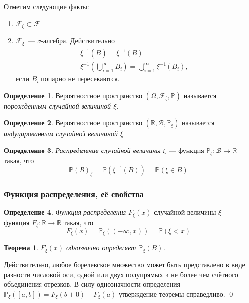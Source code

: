 \documentclass[oneside,final,14pt]{extreport}
\newcommand\myprob[1]{{\mathbb{P}(#1)}}
\renewenvironment{proof}{{\bfseries Доказательство.}}{\qed}
\newtheorem{thm}{Теорема}[section]
\theoremstyle{definition}
\newtheorem{defn}{Определение}[section]
\begin{document}
Отметим следующие факты:
\begin{enumerate}
    \item $\mathcal{F}_\xi \subset \mathcal{F}.$
    \item $\mathcal{F}_\xi$~--- $\sigma$-алгебра. Действительно
    \begin{gather*}
        \xi^{-1}(\overline{B}) = \overline{\xi^{-1}(B)} \\
        \xi^{-1}\left(\bigcup\limits_{i=1}^{\infty}B_i\right) = \bigcup\limits_{i=1}^\infty \xi^{-1}(B_i),
    \end{gather*}
   если $B_i$ попарно не пересекаются.
\end{enumerate}

\begin{defn}
    Вероятностное пространство $(\Omega,\mathcal{F}_\xi,\mathbb{P})$ называется {\it порожденным случайной величиной $\xi$}.
\end{defn}

\begin{defn}
    Вероятностное пространство $(\mathbb{R}, \mathcal{B}, \mathbb{P}_\xi)$ называется {\it индуцированным случайной величиной $\xi$}.
\end{defn}

\begin{defn}
    {\it Распределение случайной величины} $\xi$~--- функция $\mathbb{P}_\xi: \mathcal{B} \rightarrow \mathbb{R}$ такая, что
    \begin{equation*}
        \myprob{B}_\xi = \myprob{\xi^{-1}(B)} = \myprob{\xi \in B}
    \end{equation*}
\end{defn}
\subsubsection{Функция распределения, её свойства}
\begin{defn}
    {\it Функция распределения} $F_\xi (x)$ случайной величины $\xi$~--- функция $F_\xi: \mathbb{R} \rightarrow \mathbb{R}$ такая, что
    \begin{equation*}
        F_{\xi}(x)=\mathbb{P}_{\xi}((-\infty, x))=\mathbb{P}(\xi<x)
    \end{equation*}
\end{defn}

\begin{thm}
    $F_\xi(x)$ однозначно определяет $\mathbb{P}_\xi(B)$.
\end{thm}
\begin{proof}
    Действительно, любое борелевское множество может быть представлено в виде разности числовой оси, одной или двух полупрямых и не более чем счётного объединения отрезков. В силу однозначности определения $\mathbb{P}_\xi([a,b]) = F_\xi(b + 0) - F_\xi(a)$ утверждение теоремы справедливо.
\end{proof}
\end{document}
